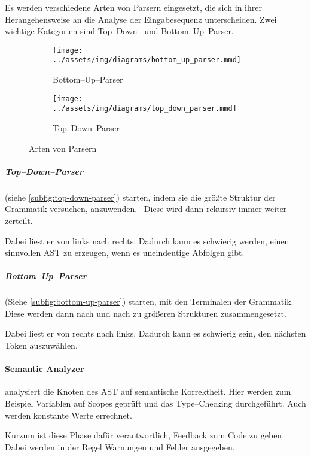 Es werden verschiedene Arten von Parsern eingesetzt, die sich in ihrer Herangehensweise an die Analyse der Eingabesequenz unterscheiden.
Zwei wichtige Kategorien sind Top--Down-- und Bottom--Up--Parser.
\begin{figure}[ht]
    \begin{subfigure}[c]{0.5\textwidth}
        \begin{center}
            \texttt{[image: ../assets/img/diagrams/bottom\_up\_parser.mmd]}
        \end{center}
        \caption{Bottom--Up--Parser}
        \label{subfig:bottom-up-parser}
    \end{subfigure}
    \begin{subfigure}[c]{0.5\textwidth}
        \begin{center}
            \texttt{[image: ../assets/img/diagrams/top\_down\_parser.mmd]}
        \end{center}
        \caption{Top--Down--Parser}
        \label{subfig:top-down-parser}
    \end{subfigure}
    \caption{Arten von Parsern}
    \label{fig:parser-types}
\end{figure}

\subparagraph{Top--Down--Parser} (siehe \autoref{subfig:top-down-parser}) starten, indem sie die größte Struktur der Grammatik versuchen, anzuwenden.~\autocite{geeksforgeeks-2021A}
Diese wird dann rekursiv immer weiter zerteilt.

Dabei liest er von links nach rechts.
Dadurch kann es schwierig werden, einen sinnvollen \ac{AST} zu erzeugen, wenn es uneindeutige Abfolgen gibt.

\subparagraph{Bottom--Up--Parser} (Siehe \autoref{subfig:bottom-up-parser}) starten, mit den Terminalen der Grammatik.~\autocite{geeksforgeeks-2021B}
Diese werden dann nach und nach zu größeren Strukturen zusammengesetzt.

Dabei liest er von rechts nach links.
Dadurch kann es schwierig sein, den nächsten Token auszuwählen.

\paragraph{Semantic Analyzer} analysiert die Knoten des \ac{AST} auf semantische Korrektheit.
Hier werden zum Beispiel Variablen auf Scopes geprüft und das Type--Checking durchgeführt.
Auch werden konstante Werte errechnet.

Kurzum ist diese Phase dafür verantwortlich, Feedback zum Code zu geben.
Dabei werden in der Regel Warnungen und Fehler ausgegeben.

